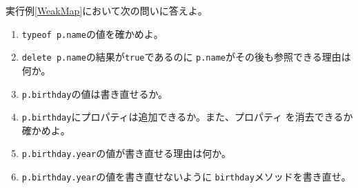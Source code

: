 \begin{Prob}\upshape
実行例\else\ref{WeakMap}\fi において次の問いに答えよ。
\begin{enumerate}
   \item \texttt{typeof p.name}の値を確かめよ。\ifText\vspace{0.03\textheight}\fi
   \item \texttt{delete p.name}の結果が\texttt{true}であるのに
         \texttt{p.name}がその後も参照できる理由は何か。\ifText\vspace{0.03\textheight}\fi
   \item \texttt{p.birthday}の値は書き直せるか。\ifText\vspace{0.03\textheight}\fi
   \item \texttt{p.birthday}にプロパティは追加できるか。また、プロパティ
         を消去できるか確かめよ。\ifText\vspace{0.05\textheight}\fi
   \item \texttt{p.birthday.year}の値が書き直せる理由は何か。\ifText\vspace{0.03\textheight}\fi
   \item \texttt{p.birthday.year}の値を書き直せないように
         \texttt{birthday}メソッドを書き直せ。\ifText\vspace{0.07\textheight}\fi
\end{enumerate}
\end{Prob}
